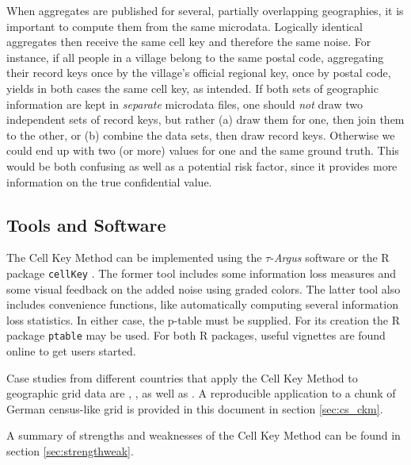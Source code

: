 When aggregates are published for several, partially overlapping geographies, it is important to compute them from the same microdata. Logically identical aggregates then receive the same cell key and therefore the same noise. For instance, if all people in a village belong to the same postal code, aggregating their record keys once by the village's official regional key, once by postal code, yields in both cases the same cell key, as intended. If both sets  of geographic information are kept in \emph{separate} microdata files, one should \emph{not} draw two independent sets of record keys, but rather (a) draw them for one, then join them to the other, or (b) combine the data sets, then draw record keys. Otherwise we could end up with two (or more) values for one and the same ground truth. 
This would be both confusing as well as a potential risk factor, since it provides more information on the true confidential value.

\subsection{Tools and Software}

The Cell Key Method can be implemented using the $\tau$-\emph{Argus} software \citep{QuickRefTau42x} or the R package \texttt{cellKey} \citep{cellkey_meindl}. The former tool includes some information loss measures and some visual feedback on the added noise using graded colors. The latter tool also includes convenience functions, like automatically computing several information loss statistics.
In either case, the p-table must be supplied. For its creation the R package \texttt{ptable} may be used. For both R packages, useful vignettes are found online to get users started.\bigskip

Case studies from different countries that apply the Cell Key Method to geographic grid data are \citet{Kraus2021}, \citet{Dekany2019}, as well as \citet{LukanSmukavec2017}. A reproducible application to a chunk of German census-like grid is provided in this document in section \ref{sec:cs_ckm}.

A summary of strengths and weaknesses of the Cell Key Method can be found in section \ref{sec:strengthweak}.

\newpage
